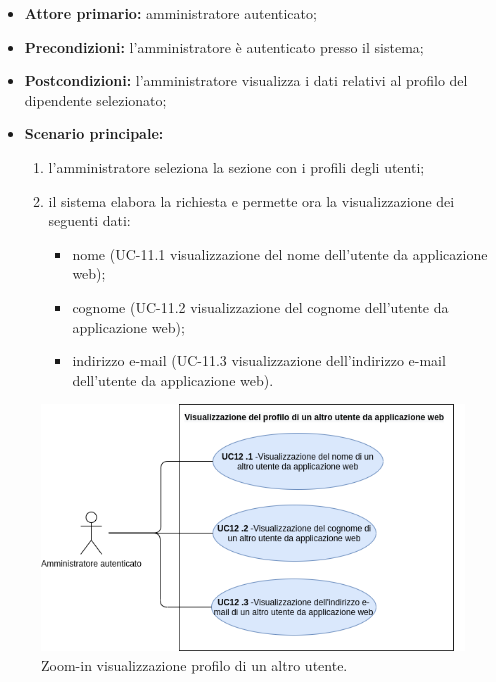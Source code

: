 \begin{itemize}
	\item \textbf{Attore primario:} amministratore autenticato;

	\item \textbf{Precondizioni:} l'amministratore è autenticato presso il sistema;

	\item \textbf{Postcondizioni:} l'amministratore visualizza i dati relativi al profilo del dipendente selezionato;

	\item \textbf{Scenario principale:}
	\begin{enumerate}
    	\item  l'amministratore seleziona la sezione con i profili degli utenti;
    	\item  il sistema elabora la richiesta e permette ora la visualizzazione dei seguenti dati:
    	\begin{itemize}
        	\item nome (UC-11.1 visualizzazione del nome dell'utente da applicazione web);
        	\item cognome (UC-11.2 visualizzazione del cognome dell'utente da applicazione web);
        	\item indirizzo e-mail (UC-11.3 visualizzazione dell'indirizzo e-mail dell'utente da applicazione web).
    	\end{itemize}
	\end{enumerate}
\end{itemize}

\begin{figure}[H]
	\centering
	\includegraphics[width=\textwidth]{src/CasiDUso/immagini/SottocasiVisualizzazioneAdmin.png}
	\caption{Zoom-in visualizzazione profilo di un altro utente.}
\end{figure}

